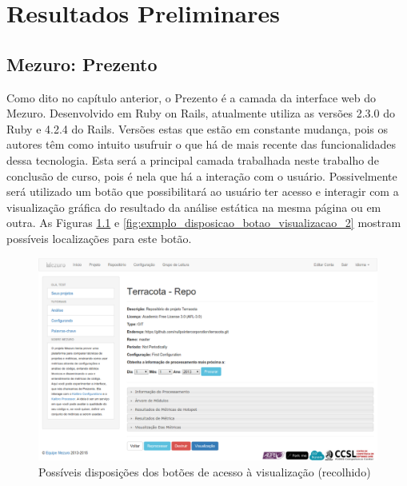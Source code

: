 \chapter{Resultados Preliminares}

\section{Mezuro: Prezento}

Como dito no capítulo anterior, o Prezento é a camada da interface web do
Mezuro. Desenvolvido em Ruby on Rails, atualmente utiliza as versões 2.3.0 do
Ruby e 4.2.4 do Rails. Versões estas que estão em constante mudança, pois os
autores têm como intuito usufruir o que há de mais recente das funcionalidades
dessa tecnologia. Esta será a principal camada trabalhada neste trabalho de
conclusão de curso, pois é
nela que há a interação com o usuário. Possivelmente será utilizado um botão que
possibilitará ao usuário ter acesso e interagir com a visualização gráfica do
resultado da análise estática na mesma página ou em outra. As Figuras
\ref{fig:exmplo_disposicao_botao_visualizacao_1} e
\ref{fig:exmplo_disposicao_botao_visualizacao_2} mostram possíveis localizações
para este botão.


\begin{figure}[!htb]
	\centering
    \includegraphics[keepaspectratio=true,scale=0.33]
    {figuras/exmplo_disposicao_botao_visualizacao_1.eps}
  \caption{Possíveis disposições dos botões de acesso à visualização (recolhido)}
  \label{fig:exmplo_disposicao_botao_visualizacao_1}
\end{figure}

